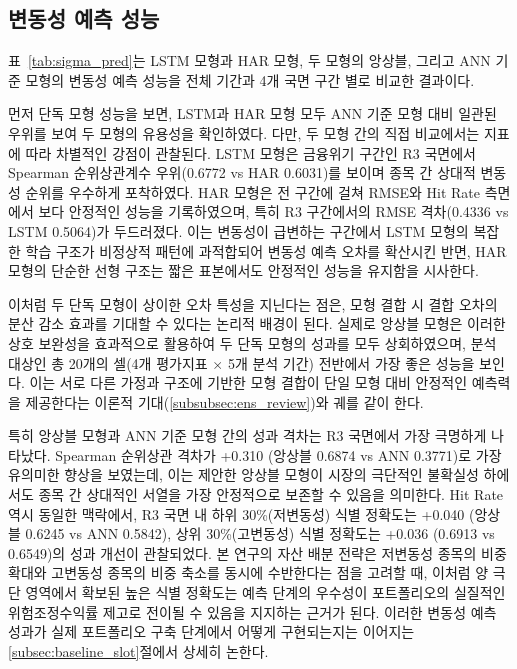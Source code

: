 \documentclass[eng]{kjas3}
\begin{document}
\subsection{변동성 예측 성능}\label{subsec:vol_pred_eval}

표~\ref{tab:sigma_pred}는 LSTM 모형과 HAR 모형, 두 모형의 앙상블, 그리고 ANN 기준 모형의 변동성 예측 성능을 전체 기간과 4개 국면 구간 별로 비교한 결과이다.

먼저 단독 모형 성능을 보면, LSTM과 HAR 모형 모두 ANN 기준 모형 대비 일관된 우위를 보여 두 모형의 유용성을 확인하였다. 다만, 두 모형 간의 직접 비교에서는 지표에 따라 차별적인 강점이 관찰된다. LSTM 모형은 금융위기 구간인 R3 국면에서 Spearman 순위상관계수 우위(0.6772 vs HAR 0.6031)를 보이며 종목 간 상대적 변동성 순위를 우수하게 포착하였다. HAR 모형은 전 구간에 걸쳐 RMSE와 Hit Rate 측면에서 보다 안정적인 성능을 기록하였으며, 특히 R3 구간에서의 RMSE 격차(0.4336 vs LSTM 0.5064)가 두드러졌다. 이는 변동성이 급변하는 구간에서 LSTM 모형의 복잡한 학습 구조가 비정상적 패턴에 과적합되어 변동성 예측 오차를 확산시킨 반면, HAR 모형의 단순한 선형 구조는 짧은 표본에서도 안정적인 성능을 유지함을 시사한다. 

이처럼 두 단독 모형이 상이한 오차 특성을 지닌다는 점은, 모형 결합 시 결합 오차의 분산 감소 효과를 기대할 수 있다는 논리적 배경이 된다. 실제로 앙상블 모형은 이러한 상호 보완성을 효과적으로 활용하여 두 단독 모형의 성과를 모두 상회하였으며, 분석 대상인 총 20개의 셀(4개 평가지표 $\times$ 5개 분석 기간) 전반에서 가장 좋은 성능을 보인다. 이는 서로 다른 가정과 구조에 기반한 모형 결합이 단일 모형 대비 안정적인 예측력을 제공한다는 이론적 기대(\ref{subsubsec:ens_review})와 궤를 같이 한다.

특히 앙상블 모형과 ANN 기준 모형 간의 성과 격차는 R3 국면에서 가장 극명하게 나타났다. Spearman 순위상관 격차가 +0.310 (앙상블 0.6874 vs ANN 0.3771)로 가장 유의미한 향상을 보였는데, 이는 제안한 앙상블 모형이 시장의 극단적인 불확실성 하에서도 종목 간 상대적인 서열을 가장 안정적으로 보존할 수 있음을 의미한다. Hit Rate 역시 동일한 맥락에서, R3 국면 내 하위 30\%(저변동성) 식별 정확도는 +0.040 (앙상블 0.6245 vs ANN 0.5842), 상위 30\%(고변동성) 식별 정확도는 +0.036 (0.6913 vs 0.6549)의 성과 개선이 관찰되었다. 본 연구의 자산 배분 전략은 저변동성 종목의 비중 확대와 고변동성 종목의 비중 축소를 동시에 수반한다는 점을 고려할 때, 이처럼 양 극단 영역에서 확보된 높은 식별 정확도는 예측 단계의 우수성이 포트폴리오의 실질적인 위험조정수익률 제고로 전이될 수 있음을 지지하는 근거가 된다. 이러한 변동성 예측 성과가 실제 포트폴리오 구축 단계에서 어떻게 구현되는지는 이어지는 \ref{subsec:baseline_slot}절에서 상세히 논한다.
\end{document}
